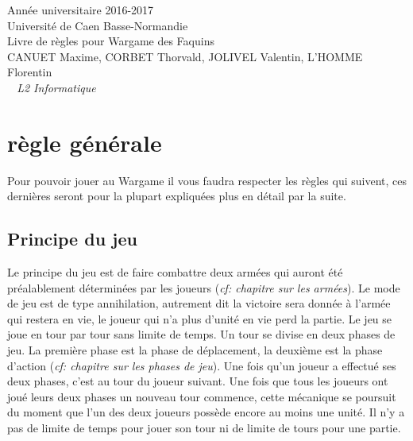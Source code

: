 \documentclass[a4paper]{article}
\begin{document}
\color{white}
\begin{titlepage}
	\begin{center}
		\Large{Année universitaire 2016-2017}\\
		\Large{Université de Caen Basse-Normandie}\\[1cm]		
		\huge Livre de règles pour Wargame des Faquins\\[0.5cm]
		\vspace{1cm}
		CANUET Maxime, CORBET Thorvald, JOLIVEL Valentin, L'HOMME Florentin\\
		\normalsize{\textit{ ~ L2 Informatique}}
		\vspace{2cm}
	\end{center}
\end{titlepage}

\newpage

\color{black}
	\tableofcontents
\newpage


\section{règle générale}


	\quad Pour pouvoir jouer au Wargame il vous faudra respecter les règles qui suivent, ces dernières seront pour la plupart expliquées plus en détail par la suite.

	\subsection{Principe du jeu}

	\quad Le principe du jeu est de faire combattre deux armées qui auront été préalablement déterminées par les joueurs (\textit{cf: chapitre sur les armées}). Le mode de jeu est de type annihilation, autrement dit la victoire sera donnée à l'armée qui restera en vie, le joueur qui n'a plus d'unité en vie perd la partie. Le jeu se joue en tour par tour sans limite de temps. Un tour se divise en deux phases de jeu. La première phase est la phase de déplacement, la deuxième est la phase d'action (\textit{cf: chapitre sur les phases de jeu}). Une fois qu'un joueur a effectué ses deux phases, c'est au tour du joueur suivant. Une fois que tous les joueurs ont joué leurs deux phases un nouveau tour commence, cette mécanique se poursuit du moment que l'un des deux joueurs possède encore au moins une unité. Il n'y a pas de limite de temps pour jouer son tour ni de limite de tours pour une partie.
\end{document}
